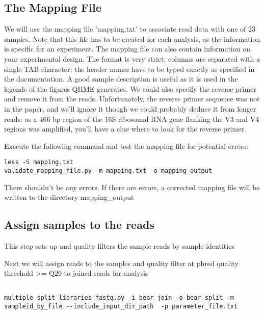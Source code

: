 \subsection{The Mapping File}

\begin{information}
We will use the mapping file 'mapping.txt' to associate read data with one of 23 samples.
Note that this file has to be created for each analysis, as the information is specific for an experiment. The mapping file can also contain information on your experimental design. The format is very strict; columns are separated with a single TAB character; the header names have to be typed exactly as specified in the documentation. A good sample description is useful as it is used in the legends of the figures QIIME generates. We could also specify the reverse primer and remove it from the reads. Unfortunately, the reverse primer sequence was not in the paper, and we'll ignore it though we could probably deduce it from longer reads: as a 466 bp region of the 16S ribosomal RNA gene flanking the V3 and V4 regions was amplified, you'll have a clue where to look for the reverse primer.

\end{information}

\begin{steps}
Execute the following command and test the mapping file for potential errors:
\begin{lstlisting}
less -S mapping.txt
validate_mapping_file.py -m mapping.txt -o mapping_output
\end{lstlisting}
\end{steps}

\begin{note}
There shouldn't be any errors. If there are errors, a corrected mapping file will be written to the directory mapping\_output
\end{note}

\subsection{Assign samples to the reads}

\begin{information}
This step sets up and quality filters the sample reads by sample identities
\end{information}

\begin{steps}
Next we will assign reads to the samples and quality filter at phred quality threshold >= Q20 to joined reads for analysis

\begin{lstlisting}

multiple_split_libraries_fastq.py -i bear_join -o bear_split -m sampleid_by_file --include_input_dir_path  -p parameter_file.txt

\end{lstlisting}

\end{steps}


